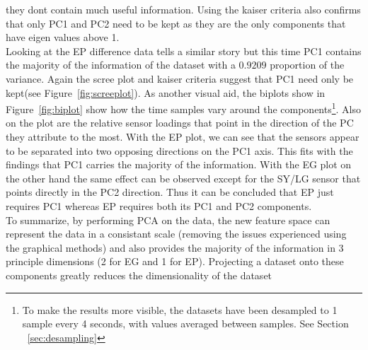\documentclass[twocolumn]{article}
\begin{document}
they dont contain much useful information. Using the kaiser criteria also confirms that only PC1 and PC2 need to be kept as they are
the only components that have eigen values above 1. \\
Looking at the EP difference data tells a similar story but this time PC1 contains the majority of the information of the dataset with
a $0.9209$ proportion of the variance. Again the scree plot and kaiser criteria suggest that PC1 need only be kept(see Figure~\ref{fig:screeplot}). 
As another visual aid, the biplots show in Figure~\ref{fig:biplot} show how the time samples vary around the components\footnote{To make the results
more visible, the datasets have been desampled to 1 sample every 4 seconds, with values averaged between samples. See Section ~\ref{sec:desampling}}. Also on the plot
are the relative sensor loadings that point in the direction of the PC they attribute to the most. With the EP plot, we can see that the sensors
appear to be separated into two opposing directions on the PC1 axis. This fits with the findings that PC1 carries the majority of the information.
With the EG plot on the other hand the same effect can be observed except for the SY/LG sensor that points directly in the PC2 direction. Thus it can
be concluded that EP just requires PC1 whereas EP requires both its PC1 and PC2 components.\\
To summarize, by performing PCA on the data, the new feature space can represent the data in a consistant scale (removing the issues experienced 
using the graphical methods) and also provides the majority of the information in 3 principle dimensions (2 for EG and 1 for EP). Projecting a 
dataset onto these components greatly reduces the dimensionality of the dataset 
\end{document}

